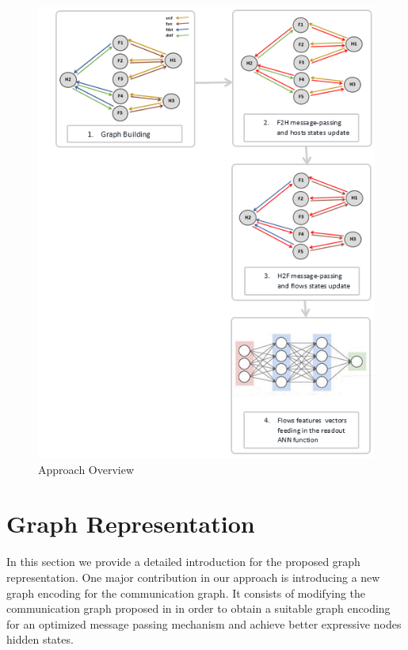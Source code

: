 \begin{figure}[H]
    \centering
    \includegraphics[scale=0.85]{figures/approach_gnn_flow_chart.png}
    \captionsetup{font=large}
    \caption{Approach Overview}
        \label{fig:app_fig}
\end{figure}


\section{Graph Representation}
In this section we provide a detailed introduction for the proposed graph representation. 
One major contribution in our approach is introducing a new graph encoding for the communication graph. It consists of modifying the communication graph proposed in \cite{unveiling} in order to obtain a suitable graph encoding for an optimized message passing mechanism and achieve better expressive nodes hidden states.  
